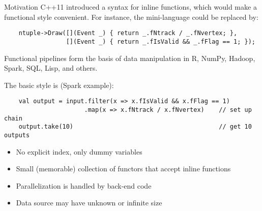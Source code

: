\documentclass{beamer}
\begin{document}
\begin{frame}[fragile]{Motivation}
C++11 introduced a syntax for inline functions, which would make a functional style convenient. For instance, the mini-language could be replaced by:
{\scriptsize \begin{verbatim}
    ntuple->Draw([](Event _) { return _.fNtrack / _.fNvertex; },
                 [](Event _) { return _.fIsValid && _.fFlag == 1; });
\end{verbatim}}

\vfill
Functional pipelines form the basis of data manipulation in R, NumPy, Hadoop, Spark, SQL, Lisp, and others.

\vfill
The basic style is (Spark example):
{\scriptsize \begin{verbatim}
    val output = input.filter(x => x.fIsValid && x.fFlag == 1)
                      .map(x => x.fNtrack / x.fNvertex)    // set up chain
    output.take(10)                                        // get 10 outputs
\end{verbatim}}
\begin{itemize}
\item No explicit index, only dummy variables
\item Small (memorable) collection of functors that accept inline functions
\item Parallelization is handled by back-end code
\item Data source may have unknown or infinite size
\end{itemize}
\end{frame}
\end{document}
